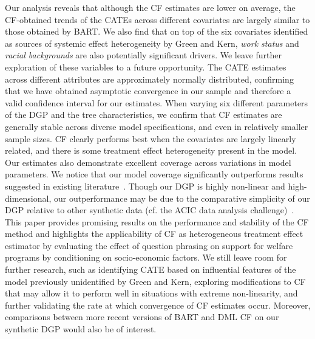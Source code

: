 \documentclass[12pt]{article}
\begin{document}
Our analysis reveals that although the CF estimates are lower on average, the
CF-obtained trends of the CATEs across different covariates are largely similar
to those obtained by BART. We also find that on top of the six covariates
identified as sources of systemic effect heterogeneity by Green and Kern,
\textit{work status} and \textit{racial backgrounds} are also potentially
significant drivers. We leave further exploration of these variables to a future
opportunity. The CATE estimates across different attributes are approximately
normally distributed, confirming that we have obtained asymptotic convergence in
our sample and therefore a valid confidence interval for our estimates. When
varying six different parameters of the DGP and the tree characteristics, we
confirm that CF estimates are generally stable across diverse model
specifications, and even in relatively smaller sample sizes. CF clearly performs
best when the covariates are largely linearly related, and there is some
treatment effect heterogeneity present in the model. Our estimates also
demonstrate excellent coverage across variations in model parameters. We notice
that our model coverage significantly outperforms results suggested in existing
literature~\cite{CarvalhoHahnMurray}. Though our DGP is highly non-linear and
high-dimensional, our outperformance may be due to the comparative simplicity of
our DGP relative to other synthetic data (cf. the ACIC data analysis
challenge)~\cite{dorieACIC}. \\

This paper provides promising results on the performance and stability of the CF
method and highlights the applicability of CF as heterogeneous treatment effect
estimator by evaluating the effect of question phrasing on support for welfare
programs by conditioning on socio-economic factors. We still leave room for
further research, such as identifying CATE based on influential features of the
model previously unidentified by Green and Kern, exploring modifications to CF
that may allow it to perform well in situations with extreme non-linearity, and
further validating the rate at which convergence of CF estimates occur.
Moreover, comparisons between more recent versions of BART and DML CF on our
synthetic DGP would also be of interest.
\end{document}

